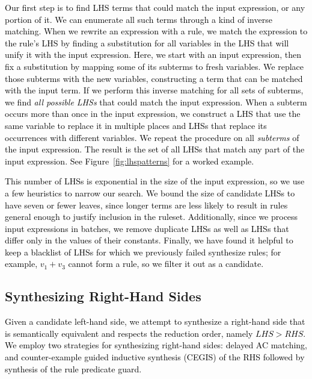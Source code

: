 \documentclass[acmsmall,review]{acmart}\settopmatter{printfolios=true,printccs=false,printacmref=false}
\newcommand{\modified}[1]{\textcolor{black}{{#1}}}
\begin{document}
\modified{
  Our first step is to find LHS terms that could match the input expression, or any portion of it. 
We can enumerate all such terms through a kind of inverse matching.
When we rewrite an expression with a rule, 
we match the expression to the rule's LHS by finding a substitution for all variables in
the LHS that will unify it with the input expression. Here, we start with an input expression,
then fix a substitution by mapping some of its subterms to fresh variables. We 
replace those subterms with the new variables, constructing a term that can 
be matched with the input term.
If we perform this inverse matching for all sets of subterms, we find \emph{all possible LHSs} that could match the
input expression. 
When a subterm occurs more than once in the input expression, we construct a LHS that 
use the same variable to replace it in multiple places and LHSs that replace its
occurrences with different variables.
We repeat the procedure on all \emph{subterms} of the input expression.  The result is the set of all 
LHSs that match any part of the input expression. See Figure~\ref{fig:lhspatterns} for a worked example. }

\modified{This number of LHSs is exponential in the size of the input expression, so we use a few heuristics to narrow 
our search. We bound the size of candidate LHSs to have seven or fewer leaves, since longer terms are less likely to 
result in rules general enough to justify inclusion in the ruleset. 
Additionally, since we process input expressions in batches, we remove 
duplicate LHSs as well as LHSs that differ only in the values of their constants. 
Finally, we have found it helpful to keep a blacklist of LHSs for which we previously
failed synthesize rules; for example, $v_1 + v_3$ 
cannot form a rule, so we filter it out as a candidate.}

\subsection{Synthesizing Right-Hand Sides} 
\label{sec:synthesizing-candidate-rules}
\modified{%
Given a candidate left-hand side, we attempt to 
synthesize a right-hand side that is semantically equivalent and
respects the reduction order, namely $\mathit{LHS} > \mathit{RHS}$.
We employ two strategies for synthesizing right-hand sides:
delayed AC matching, and counter-example guided inductive synthesis (CEGIS) of 
the RHS followed by synthesis of the rule predicate guard.} 
\end{document}
